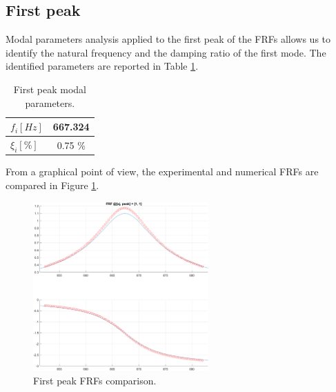 \subsection{First peak}
\label{subsec:first_peak}

Modal parameters analysis applied to the first peak of the FRFs allows us to identify the natural frequency and the damping ratio of the first mode.
The identified parameters are reported in Table \ref{tab:first_peak}.

\begin{table}[H]
    \centering
    \begin{tabular}{lc}
        \hline
        $f_i [Hz]$   & 667.324 \\
        \hline
        $\xi_i [\%]$ & 0.75 \% \\
        \hline
    \end{tabular}
    \caption{First peak modal parameters.}
    \label{tab:first_peak}
\end{table}

From a graphical point of view, the experimental and numerical FRFs are compared in Figure \ref{fig:first_peak}.

\begin{figure}[H]
    \centering
    \includegraphics[width=0.6\textwidth]{img/MATLAB/Part_B/Comparison_FRF_1_zoom_peak_01.png}
    \caption{First peak FRFs comparison.}
    \label{fig:first_peak}
\end{figure}


